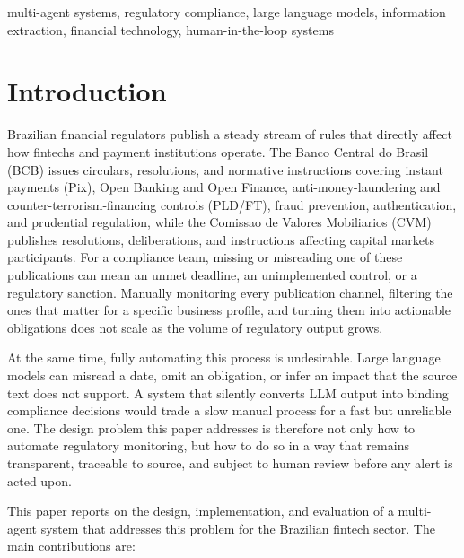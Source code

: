 \documentclass[conference]{IEEEtran}
\begin{document}
\begin{IEEEkeywords}
multi-agent systems, regulatory compliance, large language models, information extraction, financial technology, human-in-the-loop systems
\end{IEEEkeywords}

\section{Introduction}

Brazilian financial regulators publish a steady stream of rules that directly affect how fintechs and payment institutions operate. The Banco Central do Brasil (BCB) issues circulars, resolutions, and normative instructions covering instant payments (Pix), Open Banking and Open Finance, anti-money-laundering and counter-terrorism-financing controls (PLD/FT), fraud prevention, authentication, and prudential regulation, while the Comissao de Valores Mobiliarios (CVM) publishes resolutions, deliberations, and instructions affecting capital markets participants. For a compliance team, missing or misreading one of these publications can mean an unmet deadline, an unimplemented control, or a regulatory sanction. Manually monitoring every publication channel, filtering the ones that matter for a specific business profile, and turning them into actionable obligations does not scale as the volume of regulatory output grows.

At the same time, fully automating this process is undesirable. Large language models can misread a date, omit an obligation, or infer an impact that the source text does not support. A system that silently converts LLM output into binding compliance decisions would trade a slow manual process for a fast but unreliable one. The design problem this paper addresses is therefore not only how to automate regulatory monitoring, but how to do so in a way that remains transparent, traceable to source, and subject to human review before any alert is acted upon.

This paper reports on the design, implementation, and evaluation of a multi-agent system that addresses this problem for the Brazilian fintech sector. The main contributions are:
\end{document}
